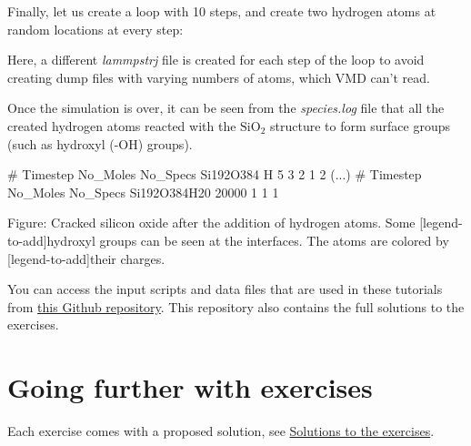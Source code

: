 \vspace{0.25cm} \noindent Finally, let us create a loop with 10 steps, and create two hydrogen atoms
at random locations at every step: 


\noindent Here, a different \textit{lammpstrj} file is created for each step of the loop to
avoid creating dump files with varying numbers of atoms, which VMD can't
read.

\vspace{0.25cm} \noindent Once the simulation is over, it can be seen from the \textit{species.log} file that
all the created hydrogen atoms reacted with the $_{2}$
structure to form surface groups (such as hydroxyl (-OH) groups).

\begin{lcverbatim}
# Timestep   No_Moles   No_Specs  Si192O384  H
  5          3          2         1          2
(...)
# Timestep   No_Moles No_Specs Si192O384H20
  20000      1        1        1
\end{lcverbatim}

Figure: Cracked silicon oxide after the addition of hydrogen atoms. Some
[legend-to-add]hydroxyl groups can be seen at the interfaces. The atoms are colored by
[legend-to-add]their charges.

\vspace{0.25cm} \noindent You can access the input scripts and data files that
are used in these tutorials from \href{https://github.com/lammpstutorials/lammpstutorials-inputs/}{this Github repository}.
This repository also contains the full solutions to the exercises.

\section{Going further with exercises}
\noindent Each exercise comes with a proposed solution, 
see \hyperref[solutions-label]{Solutions to the exercises}.

